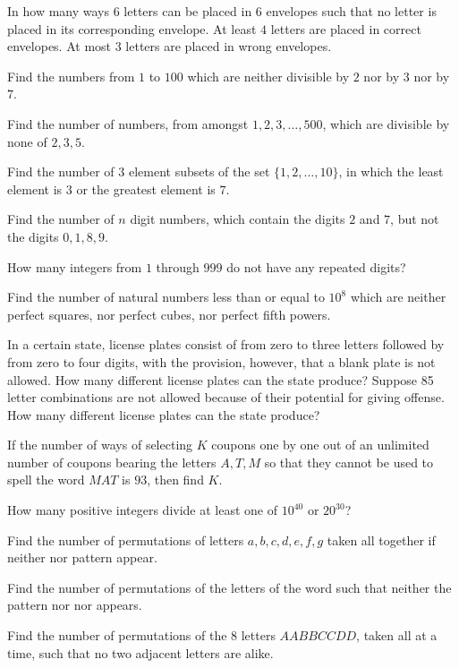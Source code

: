 \item In how many ways $6$ letters can be placed in 6 envelopes such that no letter is placed in its
  corresponding envelope. At least $4$ letters are placed in correct envelopes. At most $3$ letters are
  placed in wrong envelopes.
\item Find the numbers from $1$ to $100$ which are neither divisible by $2$ nor by $3$ nor by $7$.
\item Find the number of numbers, from amongst $1, 2, 3, \ldots, 500$, which are divisible by none of $2, 3,
  5$.
\item Find the number of $3$ element subsets of the set $\{1, 2, \ldots, 10\}$, in which the least element
  is $3$ or the greatest element is $7$.
\item Find the number of $n$ digit numbers, which contain the digits $2$ and $7$, but not the digits $0, 1,
  8, 9$.
\item How many integers from $1$ through $999$ do not have any repeated digits?
\item Find the number of natural numbers less than or equal to $10^8$ which are neither perfect squares, nor
  perfect cubes, nor perfect fifth powers.
\item In a certain state, license plates consist of from zero to three letters followed by from zero to four
  digits, with the provision, however, that a blank plate is not allowed. How many different license plates
  can the state produce? Suppose 85 letter combinations are not allowed because of their potential for
  giving offense. How many different license plates can the state produce?
\item If the number of ways of selecting $K$ coupons one by one out of an unlimited number of coupons
  bearing the letters $A, T, M$ so that they cannot be used to spell the word $MAT$ is $93$, then find $K$.
\item How many positive integers divide at least one of $10^{40}$ or $20^{30}$?
\item Find the number of permutations of letters $a, b, c, d, e, f, g$ taken all together if neither
   nor  pattern appear.
\item Find the number of permutations of the letters of the word  such that neither the
  pattern  nor  nor  appears.
\item Find the number of permutations of the $8$ letters $AABBCCDD$, taken all at a time, such that no two
  adjacent letters are alike.
